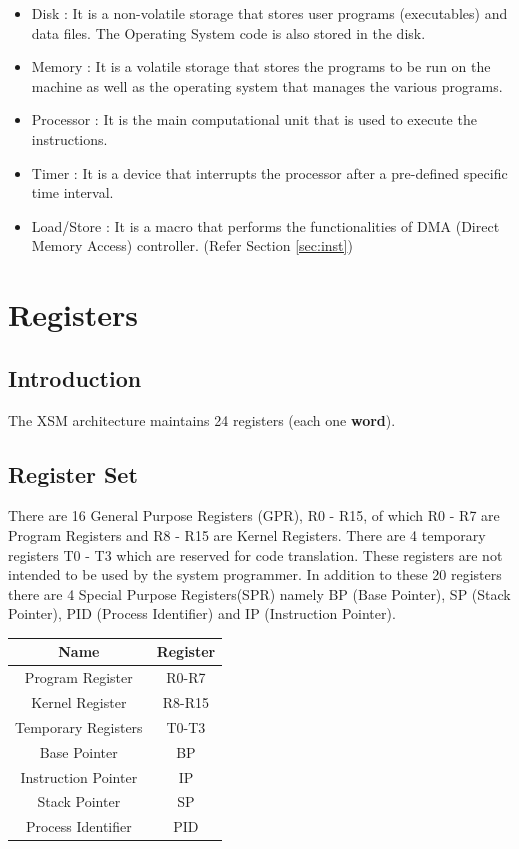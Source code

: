 \documentclass[11pt]{article}
\begin{document}
\begin{itemize}
\item Disk : It is a non-volatile storage that stores user programs (executables) and data files. The Operating System code is also stored in the disk.

\item Memory : It is a volatile storage that stores the programs to be run on the machine as well as the operating system that manages the various programs.
\item Processor : It is the main computational unit that is used to execute the instructions.
\item Timer : It is a device that interrupts the processor after a pre-defined specific time interval.
\item Load/Store : It is a macro that performs the functionalities of DMA (Direct Memory Access) controller. (Refer Section \ref{sec:inst})
\end{itemize}






\section{Registers}

\subsection{Introduction}
The XSM architecture maintains 24 registers (each one \textbf{word}).

\subsection{Register Set}
There are 16 General Purpose Registers (GPR), R0 - R15, of which R0 - R7 are Program Registers and R8 - R15 are Kernel Registers. There are 4 temporary registers T0 - T3 which are reserved for code translation. These registers are not intended to be used by the system programmer. In addition to these 20 registers there are 4 Special Purpose Registers(SPR) namely BP (Base Pointer), SP (Stack Pointer), PID (Process Identifier) and IP (Instruction Pointer).


\begin{center}
\begin{tabular}{|c|c|}
\hline Name & Register \\ 
\hline Program Register & R0-R7 \\ 
\hline Kernel Register & R8-R15 \\ 
\hline Temporary Registers & T0-T3 \\ 
\hline Base Pointer & BP \\ 
\hline Instruction Pointer & IP \\ 
\hline Stack Pointer & SP \\ 
\hline Process Identifier & PID \\
\hline
\end{tabular} 
\end{center}
\end{document}
